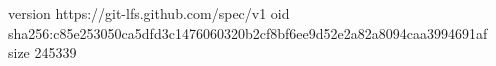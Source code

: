 version https://git-lfs.github.com/spec/v1
oid sha256:c85e253050ca5dfd3c1476060320b2cf8bf6ee9d52e2a82a8094caa3994691af
size 245339
